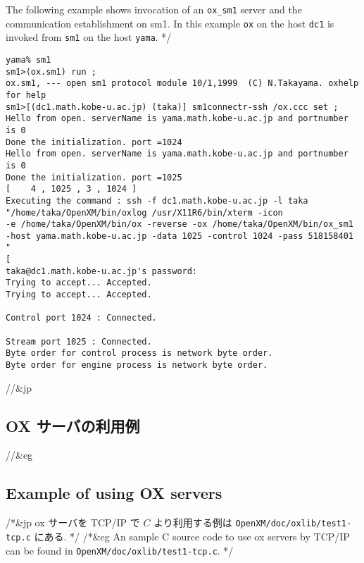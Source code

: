 The following example shows invocation of an {\tt ox\_sm1}
server and the communication establishment on {\rm sm1}.
In this example {\tt ox} on the host {\tt dc1} is invoked from 
{\tt sm1} on the host {\tt yama}.
*/
{\footnotesize
\begin{verbatim}
yama% sm1
sm1>(ox.sm1) run ;
ox.sm1, --- open sm1 protocol module 10/1,1999  (C) N.Takayama. oxhelp for help
sm1>[(dc1.math.kobe-u.ac.jp) (taka)] sm1connectr-ssh /ox.ccc set ;
Hello from open. serverName is yama.math.kobe-u.ac.jp and portnumber is 0
Done the initialization. port =1024
Hello from open. serverName is yama.math.kobe-u.ac.jp and portnumber is 0
Done the initialization. port =1025
[    4 , 1025 , 3 , 1024 ] 
Executing the command : ssh -f dc1.math.kobe-u.ac.jp -l taka 
"/home/taka/OpenXM/bin/oxlog /usr/X11R6/bin/xterm -icon 
-e /home/taka/OpenXM/bin/ox -reverse -ox /home/taka/OpenXM/bin/ox_sm1 
-host yama.math.kobe-u.ac.jp -data 1025 -control 1024 -pass 518158401   "
[ 
taka@dc1.math.kobe-u.ac.jp's password: 
Trying to accept... Accepted.
Trying to accept... Accepted.

Control port 1024 : Connected.

Stream port 1025 : Connected.
Byte order for control process is network byte order.
Byte order for engine process is network byte order.
\end{verbatim}
}

//&jp \subsection{OX サーバの利用例}
//&eg \subsection{Example of using OX servers}

/*&jp
ox サーバを TCP/IP で $C$ より利用する例は 
{\tt OpenXM/doc/oxlib/test1-tcp.c} にある.
*/
/*&eg
An sample C source code to use ox servers by TCP/IP can be found
in {\tt OpenXM/doc/oxlib/test1-tcp.c}.
*/
